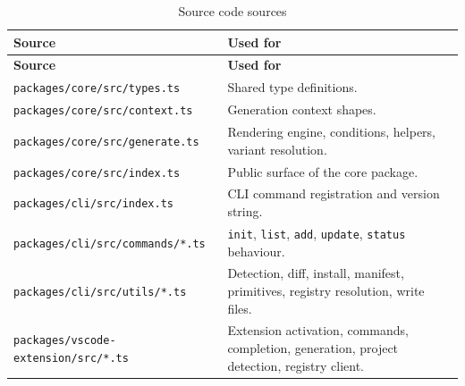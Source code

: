 \begin{longtable}{@{}L{6.2cm}L{8cm}@{}}
\caption{Source code sources}\\
\toprule
\textbf{Source} & \textbf{Used for} \\
\midrule
\endfirsthead
\toprule
\textbf{Source} & \textbf{Used for} \\
\midrule
\endhead
\texttt{packages/core/src/types.ts} & Shared type definitions. \\
\texttt{packages/core/src/context.ts} & Generation context shapes. \\
\texttt{packages/core/src/generate.ts} & Rendering engine, conditions, helpers,
variant resolution. \\
\texttt{packages/core/src/index.ts} & Public surface of the core package. \\
\texttt{packages/cli/src/index.ts} & CLI command registration and version string. \\
\texttt{packages/cli/src/commands/*.ts} & \texttt{init}, \texttt{list},
\texttt{add}, \texttt{update}, \texttt{status} behaviour. \\
\texttt{packages/cli/src/utils/*.ts} & Detection, diff, install, manifest,
primitives, registry resolution, write files. \\
\texttt{packages/vscode-extension/src/*.ts} & Extension activation, commands,
completion, generation, project detection, registry client. \\
\bottomrule
\end{longtable}

